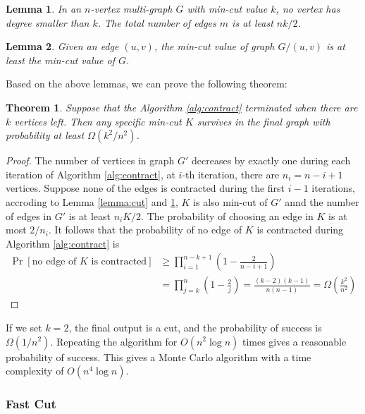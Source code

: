 \documentclass[11pt]{article}
\theoremstyle{plain}
\newtheorem{lemma}{Lemma}[section]
\newtheorem{theorem}{Theorem}[section]
\begin{document}
\begin{lemma}
    \label{lemma:degree}
    In an $n$-vertex multi-graph $G$ with min-cut value $k$, no vertex has degree smaller than $k$. The total number of edges $m$ is at least $nk/2$.
\end{lemma}

\begin{lemma}
    \label{lemma:contract}
    Given an edge $(u,v)$, the min-cut value of graph $G/(u,v)$ is at least the min-cut value of $G$.
\end{lemma}

Based on the above lemmas, we can prove the following theorem:

\begin{theorem}
    \label{theorem:contract}
    Suppose that the Algorithm \ref{alg:contract} terminated when there are $k$ vertices left. Then any specific min-cut $K$ survives in the final graph with probability at least $\Omega(k^2/n^2)$.
\end{theorem}
\begin{proof}
    The number of vertices in graph $G'$ decreases by exactly one during each iteration of Algorithm \ref{alg:contract}, at $i$-th iteration, there are $n_i=n-i+1$ vertices. Suppose none of the edges is contracted during the first $i-1$ iterations, accroding to Lemma \ref{lemma:cut} and \ref{lemma:degree}, $K$ is also min-cut of $G'$ annd the number of edges in $G'$ is at least $n_iK/2$. The probability of choosing an edge in $K$ is at most $2/n_i$. It follows that the probability of no edge of $K$ is contracted during Algorithm \ref{alg:contract} is
\begin{align*}
    \Pr[\text{no edge of }K\text{ is contracted}]&\ge\prod_{i=1}^{n-k+1}\left(1-\frac{2}{n-i+1}\right)\\
    &=\prod_{j=k}^n\left(1-\frac{2}{j}\right)=\frac{(k-2)(k-1)}{n(n-1)}=\Omega\left(\frac{k^2}{n^2}\right)
\end{align*}
\end{proof}


If we set $k=2$, the final output is a cut, and the probability of success is $\Omega(1/n^2)$. Repeating the algorithm for $O(n^2\log n)$ times gives a reasonable probability of success. This gives a Monte Carlo algorithm with a time complexity of $O(n^4\log n)$.

\subsubsection{Fast Cut}\
\end{document}
